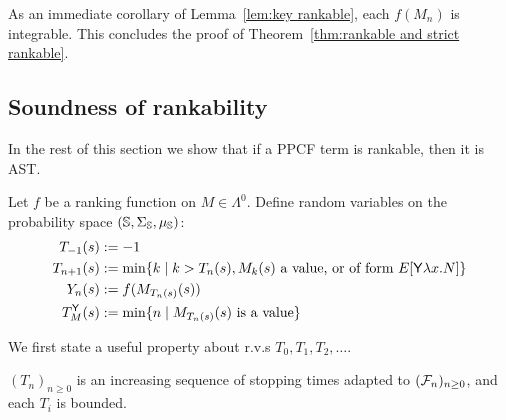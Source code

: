 As an immediate corollary of Lemma~\ref{lem:key rankable}, each $f(M_n)$ is integrable.
This concludes the proof of Theorem~\ref{thm:rankable and strict rankable}. 

\subsection{Soundness of rankability}

In the rest of this section we show that if a PPCF term is rankable, then it is AST. 

Let $f$ be a ranking function on $M \in \Lambda^0$.
Define random variables on the probability space $({\mathbb{S}}, \Sigma_{\mathbb{S}}, \mu_{{\mathbb{S}}})$:
\begin{align}
T_{-1}(s) & := -1 \nonumber \\
T_{n+1}(s) & := \min \{ k \mid k>T_n(s), M_k(s) \textrm{ a value, or of form } E[\tY \lambda x. N] \} \nonumber \\
Y_n(s) & := f(M_{T_n(s)}(s)) \nonumber \\
T_M^\tY(s) &:= \min \set{n \mid M_{T_n(s)}(s) \textrm{ is a value}} \label{eq:y stopping time} 
\end{align}

We first state a useful property about r.v.s $T_0, T_1, T_2, \dots$.
\begin{lemma}
\label{lem:TnBounded}
$(T_n)_{n \geq 0}$ is an increasing sequence of stopping times adapted to $(\mathcal{F}_n)_{n \geq 0}$, and each $T_i$ is bounded.
\end{lemma}

\newcommand\transform[1]{{\ulcorner{#1}\urcorner}}

\iffalse
As before, fix a $M \in \Lambda^0$.
Recall the random variables on $(S, \calF, \mu)$:
\begin{align*}
T_0(s) & := 0 \\
T_{n+1}(s) & := \min \{ k \mid k>T_n(s), M_k(s) \textrm{ a value or of form } E[\tY \lambda x. N] \}
\end{align*}
\fi

